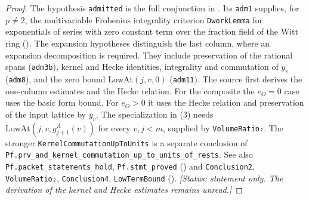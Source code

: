 \begin{proof}
The hypothesis \texttt{admitted} is the full conjunction in .
Its \texttt{adm1} supplies, for $p\ne2$, the multivariable Frobenius integrality criterion \texttt{DworkLemma} for exponentials of series with zero constant term
over the fraction field of the Witt ring ().
The expansion hypotheses distinguish the last column, where an expansion decomposition is required.
They include preservation of the rational spans (\texttt{adm3b}), kernel and Hecke identities,
integrality and commutation of $y_v$ (\texttt{adm8}), and the zero bound $\mathrm{LowAt}(j,v,0)$ (\texttt{adm11}).
The source first derives the one-column estimates and the Hecke relation. For the composite the $e_O=0$
case uses the basic form bound. For $e_O>0$ it uses the Hecke relation and preservation of the input
lattice by $y_v$. The specialization in (3) needs $\mathrm{LowAt}(j,v,g^A_{j+1}(v))$ for every $v,j<m$,
supplied by \texttt{VolumeRatio₂}. The stronger \texttt{KernelCommutationUpToUnits} is a separate
conclusion of \texttt{Pf.prv\_and\_kernel\_commutation\_up\_to\_units\_of\_rests}.
See also \texttt{Pf.packet\_statements\_hold}, \texttt{Pf.stmt\_proved}
() and
\texttt{Conclusion2}, \texttt{VolumeRatio₂}, \texttt{Conclusion4}, \texttt{LowTermBound}
().
\textit{[Status: statement only. The derivation of the kernel and Hecke estimates remains unread.]}
\end{proof}

